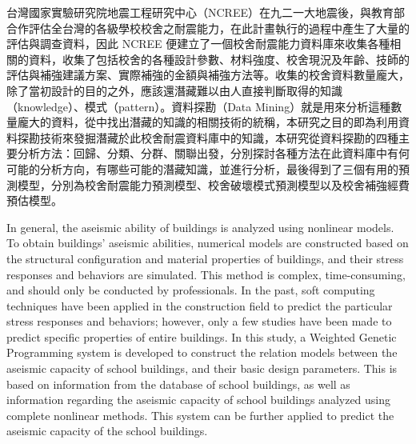 
台灣國家實驗研究院地震工程研究中心（NCREE）在九二一大地震後，與教育部合作評估全台灣的各級學校校舍之耐震能力，在此計畫執行的過程中產生了大量的評估與調查資料，因此 NCREE 便建立了一個校舍耐震能力資料庫來收集各種相關的資料，收集了包括校舍的各種設計參數、材料強度、校舍現況及年齡、技師的評估與補強建議方案、實際補強的金額與補強方法等。收集的校舍資料數量龐大，除了當初設計的目的之外，應該還潛藏難以由人直接判斷取得的知識（knowledge）、模式（pattern）。資料探勘（Data Mining）就是用來分析這種數量龐大的資料，從中找出潛藏的知識的相關技術的統稱，本研究之目的即為利用資料探勘技術來發掘潛藏於此校舍耐震資料庫中的知識，本研究從資料探勘的四種主要分析方法：回歸、分類、分群、關聯出發，分別探討各種方法在此資料庫中有何可能的分析方向，有哪些可能的潛藏知識，並進行分析，最後得到了三個有用的預測模型，分別為校舍耐震能力預測模型、校舍破壞模式預測模型以及校舍補強經費預估模型。
	
In general, the aseismic ability of buildings is analyzed using nonlinear models. To obtain buildings’ aseismic abilities, numerical models are constructed based on the structural configuration and material properties of buildings, and their stress responses and behaviors are simulated. This method is complex, time-consuming, and should only be conducted by professionals. In the past, soft computing techniques have been applied in the construction field to predict the particular stress responses and behaviors; however, only a few studies have been made to predict specific properties of entire buildings. In this study, a Weighted Genetic Programming system is developed to construct the relation models between the aseismic capacity of school buildings, and their basic design parameters. This is based on information from the database of school buildings, as well as information regarding the aseismic capacity of school buildings analyzed using complete nonlinear methods. This system can be further applied to predict the aseismic capacity of the school buildings.